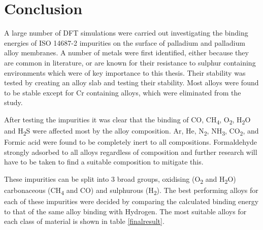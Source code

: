 \section{Conclusion}
A large number of DFT simulations were carried out investigating the binding energies of ISO 14687-2 impurities on the surface of palladium and palladium alloy membranes. A number of metals were first identified, either because they are common in literature, or are known for their resistance to sulphur containing environments which were of key importance to this thesis. Their stability was tested by creating an alloy slab and testing their stability. Most alloys were found to be stable except for Cr containing alloys, which were eliminated from the study. 

After testing the impurities it was clear that the binding of CO, CH\textsubscript{4}, O\textsubscript{2}, H\textsubscript{2}O and H\textsubscript{2}S were affected most by the alloy composition. Ar, He, N\textsubscript{2}, NH\textsubscript{3}, CO\textsubscript{2}, and Formic acid were found to be completely inert to all compositions. Formaldehyde strongly adsorbed to all alloys regardless of composition and further research will have to be taken to find a suitable composition to mitigate this. 

These impurities can be split into 3 broad groups, oxidising (O\textsubscript{2} and H\textsubscript{2}O) carbonaceous (CH\textsubscript{4} and CO) and sulphurous (H\textsubscript{2}). The best performing alloys for each of these impurities were decided by comparing the calculated binding energy to that of the same alloy binding with Hydrogen. The most suitable alloys for each class of material is shown in table \ref{finalresult}.

